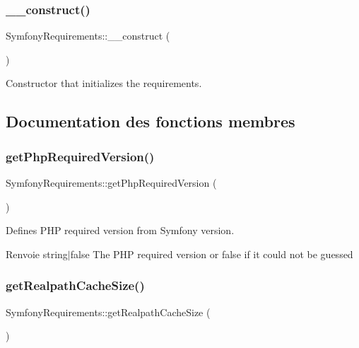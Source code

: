 \subsubsection{\texorpdfstring{\+\_\+\+\_\+construct()}{\_\_construct()}}
{\footnotesize\ttfamily Symfony\+Requirements\+::\+\_\+\+\_\+construct (\begin{DoxyParamCaption}{ }\end{DoxyParamCaption})}

Constructor that initializes the requirements. 

\subsection{Documentation des fonctions membres}
\mbox{\label{classSymfonyRequirements_ae0578284b71aadf39c3457fc5d3f5aa1}} 
\subsubsection{\texorpdfstring{get\+Php\+Required\+Version()}{getPhpRequiredVersion()}}
{\footnotesize\ttfamily Symfony\+Requirements\+::get\+Php\+Required\+Version (\begin{DoxyParamCaption}{ }\end{DoxyParamCaption})\hspace{0.3cm}{\ttfamily [protected]}}

Defines P\+HP required version from Symfony version.

\begin{DoxyReturn}{Renvoie}
string$\vert$false The P\+HP required version or false if it could not be guessed 
\end{DoxyReturn}
\mbox{\label{classSymfonyRequirements_a32cc5be91d7f8049b0f49ef118e2cd04}} 
\subsubsection{\texorpdfstring{get\+Realpath\+Cache\+Size()}{getRealpathCacheSize()}}
{\footnotesize\ttfamily Symfony\+Requirements\+::get\+Realpath\+Cache\+Size (\begin{DoxyParamCaption}{ }\end{DoxyParamCaption})\hspace{0.3cm}{\ttfamily [protected]}}

